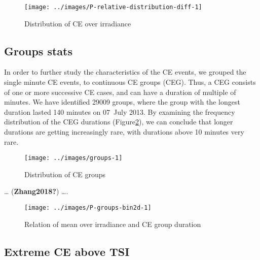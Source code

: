 \documentclass[
]{article}
\begin{document}
\begin{figure}[h!]

{\centering \texttt{[image: ../images/P-relative-distribution-diff-1]} 

}

\caption{Distribution of CE over irradiance}\label{fig:ovir-distribution}
\end{figure}

\FloatBarrier

\hypertarget{groups-stats}{%
\subsection{Groups stats}\label{groups-stats}}

In order to further study the characteristics of the CE events, we grouped the single
minute CE events, to continuous CE groups (CEG). Thus, a CEG consists of one or more
successive CE cases, and can have a duration of multiple of minutes. We have
identified 29009 groups, where the group with the longest duration lasted
140 minutes on
07~July 2013.
By examining the frequency distribution of the CEG durations
(Figure\nobreakspace{}\ref{fig:ceg-duration-distribution}), we can conclude that
longer durations are getting increasingly rare, with durations above 10 minutes very
rare.

\begin{figure}[h!]

{\centering \texttt{[image: ../images/groups-1]} 

}

\caption{Distribution of CE groups}\label{fig:ceg-duration-distribution}
\end{figure}

\ldots{} (\textbf{Zhang2018?}) \ldots.

\begin{figure}[h!]

{\centering \texttt{[image: ../images/P-groups-bin2d-1]} 

}

\caption{Relation of mean over irradiance and CE group duration}\label{fig:unnamed-chunk-3}
\end{figure}

\FloatBarrier

\hypertarget{extreme-ce-above-tsi}{%
\subsection{Extreme CE above TSI}\label{extreme-ce-above-tsi}}
\end{document}

